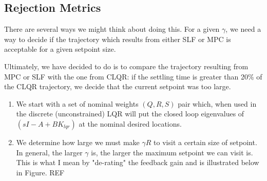 \documentclass[journal,twocolumn,twoside]{IEEEtran}
\begin{document}
 


\subsection{Rejection Metrics}\label{sec:metrics}
There are several ways we might think about doing this. 
For a given $\gamma$, we need a way to decide if the trajectory which results from either SLF or MPC is acceptable for a given setpoint size.

Ultimately, we have decided to do is to compare the trajectory resulting from MPC or SLF with the one from CLQR: if the settling time is greater than 20\% of the CLQR trajectory, we decide that the current setpoint was too large.


\begin{enumerate}
\item We start with a set of nominal weights \((Q,R, S)\) pair which, when used in the discrete (unconstrained) LQR will put the closed loop eigenvalues of $(sI - A + BK_{lqr})$ at the nominal desired locations. 
\item We determine how large we must make \(\gamma R\) to visit a certain size of setpoint. In general, the larger \(\gamma\) is, the larger the maximum setpoint we can visit is. This is what I mean by "de-rating" the feedback gain and is illustrated below in Figure. REF
\end{enumerate}
\end{document}
